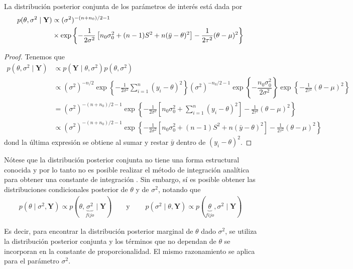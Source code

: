 \begin{Res}
La distribución posterior conjunta de los parámetros de interés está dada por
\begin{align}
p(\theta,\sigma^2 \mid \mathbf{Y})&\propto (\sigma^2)^{-(n+n_0)/2-1} \notag \\
&\times
\exp\left\{-\frac{1}{2\sigma^2}\left[n_0\sigma^2_0+(n-1)S^2
                                     +n(\bar{y}-\theta)^2\right]-\frac{1}{2\tau^2}(\theta-\mu)^2\right\}
\end{align}
\end{Res}


\begin{proof}
Tenemos que
\begin{align*}
p(\theta,\sigma^2 \mid \mathbf{Y})&\propto p(\mathbf{Y} \mid \theta,\sigma^2)p(\theta,\sigma^2)\\
&\propto(\sigma^2)^{-n/2}\exp\left\{-\frac{1}{2\sigma^2}\sum_{i=1}^n(y_i-\theta)^2\right\}(\sigma^2)^{-n_0/2-1}\exp\left\{-\dfrac{n_0\sigma^2_0}{2\sigma^2}\right\}
\exp\left\{-\frac{1}{2\tau^2}(\theta-\mu)^2\right\} \\
&=(\sigma^2)^{-(n+n_0)/2-1}\exp\left\{-\frac{1}{2\sigma^2}\left[n_0\sigma^2_0+\sum_{i=1}^n(y_i-\theta)^2\right]-\frac{1}{2\tau^2}(\theta-\mu)^2\right\}\\
&\propto (\sigma^2)^{-(n+n_0)/2-1}\exp\left\{-\frac{1}{2\sigma^2}\left[n_0\sigma^2_0+(n-1)S^2
                                     +n(\bar{y}-\theta)^2\right]-\frac{1}{2\tau^2}(\theta-\mu)^2\right\}
\end{align*}
dond la última expresión se obtiene al sumar y restar $\bar{y}$ dentro de $(y_i-\theta)^2$.
\end{proof}


Nótese que la distribución posterior conjunta no tiene una forma estructural conocida y por lo tanto no es posible realizar el método de integración analítica para obtener una constante de integración \cite{Migon}. Sin embargo, sí es posible obtener las distribuciones condicionales posterior de $\theta$ y de $\sigma^2$, notando que
\begin{align*}
p(\theta \mid \sigma^2,\mathbf{Y})\propto p(\theta,\underbrace{\sigma^2}_{fijo} \mid \mathbf{Y})
\ \ \ \ \ \ \ \ \ \text{y} \ \ \ \ \ \ \ \ \ \
p(\sigma^2 \mid \theta,\mathbf{Y})\propto p(\underbrace{\theta}_{fijo},\sigma^2 \mid \mathbf{Y})
\end{align*}

Es decir, para encontrar la distribución posterior marginal de $\theta$ dado $\sigma^2$, se utiliza la distribución posterior conjunta y los términos que no dependan de $\theta$ se incorporan en la constante de proporcionalidad. El mismo razonamiento se aplica para el parámetro $\sigma^2$.

